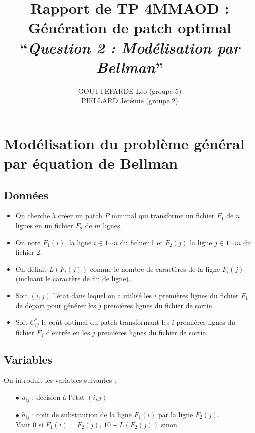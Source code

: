 \documentclass[a4paper, 10pt, french]{article}
\title{Rapport de TP 4MMAOD : Génération de patch optimal\\
``{\em Question 2 : Modélisation par Bellman}'' }
\author{
GOUTTEFARDE Léo (groupe 5)
\\ PIELLARD Jérémie (groupe 2)
}
\begin{document}
\maketitle

\section*{Modélisation du problème général par équation de Bellman}

\subsection*{Données}

\begin{itemize}
\item On cherche à créer un patch $P$ minimal qui transforme un fichier $F_1$ de $n$ lignes en un fichier $F_2$ de $m$ lignes.

\item On note $F_1(i)$, la ligne $i \in 1 \cdots n$ du fichier 1 et $F_2(j)$ la ligne $j \in 1 \cdots m$ du fichier 2.

\item On définit $L(F_i(j))$ comme le nombre de caractères de la ligne $F_i(j)$ (incluant le caractère de fin de ligne).


\item Soit $(i,j)$ l'état dans lequel on a utilisé les $i$ premières lignes du fichier $F_1$ de départ pour générer les $j$ premières lignes du fichier de sortie.

\item Soit $C^*_{ij}$ le coût optimal du patch transformant les $i$ premières lignes du fichier $F_1$ d'entrée en les $j$ premières lignes du fichier de sortie.
\end{itemize}
\vspace{3mm}


\subsection*{Variables}
On introduit les variables suivantes :
\\

\begin{itemize}
\item[$\bullet$]
$u_{ij}$ : décision à l'état $(i,j)$
\\
\item[$\bullet$]
$h_{ij}$ : coût de substitution de la ligne $F_1(i)$ par la ligne $F_2(j)$.\\
Vaut 0 si $F_1(i) = F_2(j)$, $10 + L(F_2(j))$ sinon
\end{itemize}
\vspace{6mm}
\end{document}

